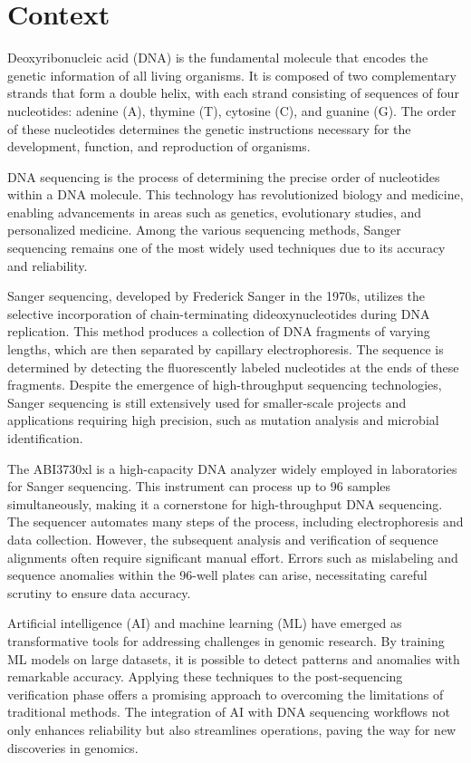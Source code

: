\section{Context}
\label{sec:Context}

\ntindex[Context]{}

Deoxyribonucleic acid (DNA) is the fundamental molecule that encodes the genetic information of all living organisms. It is composed of two complementary strands that form a double helix, with each strand consisting of sequences of four nucleotides: adenine (A), thymine (T), cytosine (C), and guanine (G). The order of these nucleotides determines the genetic instructions necessary for the development, function, and reproduction of organisms.

DNA sequencing is the process of determining the precise order of nucleotides within a DNA molecule. This technology has revolutionized biology and medicine, enabling advancements in areas such as genetics, evolutionary studies, and personalized medicine. Among the various sequencing methods, Sanger sequencing remains one of the most widely used techniques due to its accuracy and reliability.

Sanger sequencing, developed by Frederick Sanger in the 1970s, utilizes the selective incorporation of chain-terminating dideoxynucleotides during DNA replication. This method produces a collection of DNA fragments of varying lengths, which are then separated by capillary electrophoresis. The sequence is determined by detecting the fluorescently labeled nucleotides at the ends of these fragments. Despite the emergence of high-throughput sequencing technologies, Sanger sequencing is still extensively used for smaller-scale projects and applications requiring high precision, such as mutation analysis and microbial identification.

The ABI3730xl is a high-capacity DNA analyzer widely employed in laboratories for Sanger sequencing. This instrument can process up to 96 samples simultaneously, making it a cornerstone for high-throughput DNA sequencing. The sequencer automates many steps of the process, including electrophoresis and data collection. However, the subsequent analysis and verification of sequence alignments often require significant manual effort. Errors such as mislabeling and sequence anomalies within the 96-well plates can arise, necessitating careful scrutiny to ensure data accuracy.

Artificial intelligence (AI) and machine learning (ML) have emerged as transformative tools for addressing challenges in genomic research. By training ML models on large datasets, it is possible to detect patterns and anomalies with remarkable accuracy. Applying these techniques to the post-sequencing verification phase offers a promising approach to overcoming the limitations of traditional methods. The integration of AI with DNA sequencing workflows not only enhances reliability but also streamlines operations, paving the way for new discoveries in genomics.



